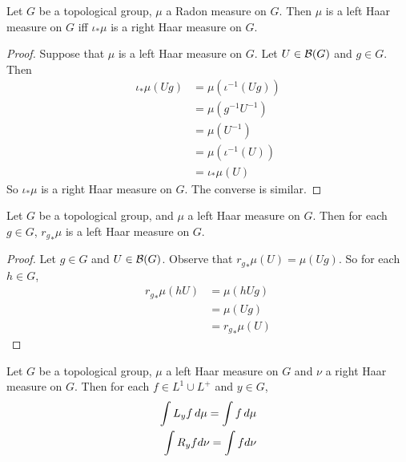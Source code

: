 \documentclass{book}
\begin{document}
	\begin{ex}  
		Let $G$ be a topological group, $\mu$ a Radon measure on $G$. Then $\mu$ is a left Haar measure on $G$ iff $\iota_*\mu$ is a right Haar measure on $G$. 
	\end{ex}
	
	\begin{proof}
		Suppose that $\mu$ is a left Haar measure on $G$. Let $U \in \mathcal{B}(G)$ and $g \in G$. Then 
		\begin{align*}
			\iota_*\mu(Ug)
			& = \mu(\iota^{-1}(Ug)) \\
			&= \mu (g^{-1}U^{-1}) \\
			&= \mu (U^{-1}) \\
			&= \mu(\iota^{-1}(U)) \\
			&= \iota_*\mu(U)
		\end{align*}
		So $\iota_*\mu$ is a right Haar measure on $G$. The converse is similar.
	\end{proof}

	\begin{ex}  
		Let $G$ be a topological group, and $\mu$ a left Haar measure on $G$. Then for each $g \in G$, ${r_{g}}_*\mu$ is a left Haar measure on $G$.
	\end{ex}

	\begin{proof}
		Let $g \in G$ and $U \in \mathcal{B}(G)$. Observe that ${r_{g}}_*\mu(U) = \mu(Ug)$. So for each $h \in G$, 
		\begin{align*}
			{r_{g}}_*\mu(hU) 
			& = \mu(hUg) \\
			& =  \mu(Ug) \\
			& = {r_{g}}_*\mu(U)
		\end{align*}
	\end{proof}
	
	\begin{ex}  
		Let $G$ be a topological group, $\mu$ a left Haar measure on $G$ and $\nu$ a right Haar measure on $G$. Then for each $f \in L^1 \cup L^+$ and $y \in G$, 
		\begin{align}
			\int L_y f \, d \mu = \int f \, d \mu \\
			\int R_y f d\nu = \int f d\nu
		\end{align}
	\end{ex}
	
\end{document}
